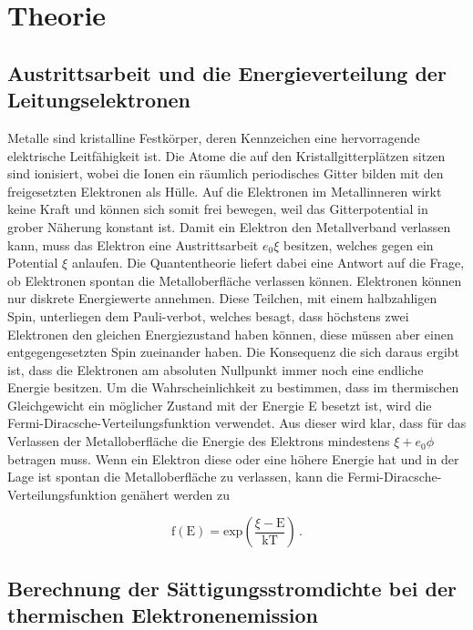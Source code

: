 \section{Theorie}

\subsection{Austrittsarbeit und die Energieverteilung der Leitungselektronen}

\begin{flushleft}
    Metalle sind kristalline Festkörper, deren Kennzeichen eine hervorragende elektrische Leitfähigkeit ist.
    Die Atome die auf den Kristallgitterplätzen sitzen sind ionisiert, wobei die Ionen ein räumlich periodisches Gitter bilden mit den freigesetzten Elektronen als Hülle.
    Auf die Elektronen im Metallinneren wirkt keine Kraft und können sich somit frei bewegen, weil das Gitterpotential in grober Näherung konstant ist.
    Damit ein Elektron den Metallverband verlassen kann, muss das Elektron eine Austrittsarbeit $e_{0}\xi$ besitzen, welches gegen ein Potential $\xi$ anlaufen. 
    Die Quantentheorie liefert dabei eine Antwort auf die Frage, ob Elektronen spontan die Metalloberfläche verlassen können.
    Elektronen können nur diskrete Energiewerte annehmen.
    Diese Teilchen, mit einem halbzahligen Spin, unterliegen dem Pauli-verbot, welches besagt, dass höchstens zwei Elektronen den gleichen Energiezustand haben können, diese müssen aber einen entgegengesetzten Spin zueinander haben.
    Die Konsequenz die sich daraus ergibt ist, dass die Elektronen am absoluten Nullpunkt immer noch eine endliche Energie besitzen.
    Um die Wahrscheinlichkeit zu bestimmen, dass im thermischen Gleichgewicht ein möglicher Zustand mit der Energie E besetzt ist, wird die Fermi-Diracsche-Verteilungsfunktion verwendet.
    Aus dieser wird klar, dass für das Verlassen der Metalloberfläche die Energie des Elektrons mindestens $\xi + e_{0}\phi$ betragen muss.
    Wenn ein Elektron diese oder eine höhere Energie hat und in der Lage ist spontan die Metalloberfläche zu verlassen, kann die Fermi-Diracsche-Verteilungsfunktion genähert werden zu
\end{flushleft}

\begin{equation}
    \text{f}(\text{E}) = \text{exp}\left(\frac{\xi - \text{E}}{\text{kT}}\right)\,. \label{1}
\end{equation}

\subsection{Berechnung der Sättigungsstromdichte bei der thermischen Elektronenemission}

